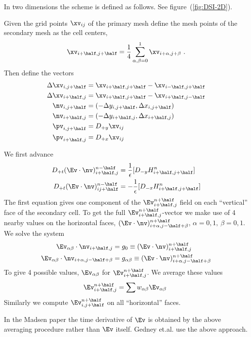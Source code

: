 \documentclass[10pt]{article}
\begin{document}
In two dimensions the scheme is defined as follows. See figure~(\ref{fig:DSI-2D}).

\newcommand{\En}{\Ev\cdot\nv}
\newcommand{\Ep}{\Ev\cdot\pv}

Given the grid points $\xv_{ij}$ of the primary mesh define the
mesh points of the secondary mesh as the cell centers,
\[
  \xv_{i\ph,j\ph } = {1\over 4} \sum_{\alpha,\beta=0}^1 \xv_{i+\alpha,j+\beta} ~.
\]
Then define the vectors
\begin{align*}
  \Delta \xv_{i,j\ph} &= \xv_{i\ph,j\ph} - \xv_{i\mh,j\ph} \\
  \Delta \xv_{i\ph,j} &= \xv_{i\ph,j\ph} - \xv_{i\ph,j\mh} \\
  \nv_{i,j\ph} &= ( -\Delta y_{i,j\ph}, \Delta x_{i,j\ph} ) \\
  \nv_{i\ph,j} &= ( -\Delta y_{i\ph,j}, \Delta x_{i\ph,j} ) \\
  \pv_{i,j\ph} &= D_{+y} \xv_{ij} \\
  \pv_{i\ph,j} &= D_{+x} \xv_{ij} 
\end{align*}

We first advance 
\begin{align}
  D_{+t} (\En)_{i\ph,j}^{n\mh} &=  {1\over\eps}[ D_{-y} H_{i\ph,j\ph}^n ] \label{eq:dsiE10} \\
  D_{+t} (\En)_{ij\ph}^{n\mh}  &= -{1\over\eps}[ D_{-x} H_{i\ph,j\ph}^n ] \label{eq:dsiE01} 
\end{align}
The first equation gives one component of the $\Ev_{i\ph,j}^{n\ph}$ field on 
each ``vertical'' face of the secondary cell.
To get the full $\Ev_{i\ph,j}^{n\ph}$-vector we make use of 4 nearby values on the
horizontal faces, $(\En)_{i+\alpha,j\mh+\beta}^{n\ph}$, $\alpha=0,1,~\beta=0,1$. We solve
the system
\begin{align*}
   \Ev_{\alpha\beta}\cdot\nv_{i\ph,j} &= g_0 \equiv (\En)_{i\ph,j}^{n\ph} \\
   \Ev_{\alpha\beta}\cdot\nv_{i+\alpha,j\mh+\beta} & = g_{\alpha\beta} \equiv (\En)_{i+\alpha,j\mh+\beta}^{n\ph}
\end{align*}
To give 4 possible values, $\Ev_{\alpha\beta}$ for $\Ev_{i\ph,j}^{n\ph}$. We average these values
\[
  \Ev_{i\ph,j}^{n\ph} = \sum w_{\alpha\beta} \Ev_{\alpha\beta}\
\]
Similarly we compute $\Ev_{i,j\ph}^{n\ph}$ on all ``horizontal'' faces.

 In the Madsen paper the time derivative of $\Ev$ is obtained by the above
averaging procedure rather than $\Ev$ itself. Gedney et.al. use the above approach.
\end{document}
